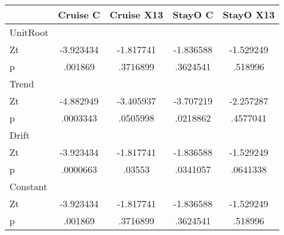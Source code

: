 \begin{tabular*}{38em}{@{\hskip\tabcolsep\extracolsep\fill}l*{1}{cccc}} \toprule
                    &    Cruise C&  Cruise X13&     StayO C&  StayO X13 \\
\midrule
UnitRoot            &            &            &            &            \\
Zt                  &   -3.923434&   -1.817741&   -1.836588&   -1.529249\\
p                   &     .001869&    .3716899&    .3624541&     .518996\\
\midrule
Trend               &            &            &            &            \\
Zt                  &   -4.882949&   -3.405937&   -3.707219&   -2.257287\\
p                   &    .0003343&    .0505998&    .0218862&    .4577041\\
\midrule
Drift               &            &            &            &            \\
Zt                  &   -3.923434&   -1.817741&   -1.836588&   -1.529249\\
p                   &    .0000663&      .03553&    .0341057&    .0641338\\
\midrule
Constant            &            &            &            &            \\
Zt                  &   -3.923434&   -1.817741&   -1.836588&   -1.529249\\
p                   &     .001869&    .3716899&    .3624541&     .518996\\
\bottomrule
\end{tabular*}
